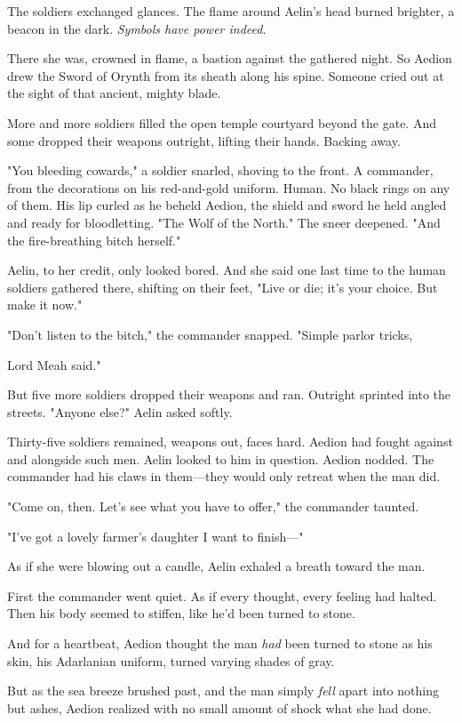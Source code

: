 The soldiers exchanged glances. The flame around Aelin's head burned brighter, a beacon in the dark. \emph{Symbols have power indeed}.

There she was, crowned in flame, a bastion against the gathered night. So Aedion drew the Sword of Orynth from its sheath along his spine. Someone cried out at the sight of that ancient, mighty blade.

More and more soldiers filled the open temple courtyard beyond the gate. And some dropped their weapons outright, lifting their hands. Backing away.

"You bleeding cowards," a soldier snarled, shoving to the front. A commander, from the decorations on his red-and-gold uniform. Human. No black rings on any of them. His lip curled as he beheld Aedion, the shield and sword he held angled and ready for bloodletting. "The Wolf of the North." The sneer deepened. "And the fire-breathing bitch herself."

Aelin, to her credit, only looked bored. And she said one last time to the human soldiers gathered there, shifting on their feet, "Live or die; it's your choice. But make it now."

"Don't listen to the bitch," the commander snapped. "Simple parlor tricks,

Lord Meah said."

But five more soldiers dropped their weapons and ran. Outright sprinted into the streets. "Anyone else?" Aelin asked softly.

Thirty-five soldiers remained, weapons out, faces hard. Aedion had fought against and alongside such men. Aelin looked to him in question. Aedion nodded. The commander had his claws in them---they would only retreat when the man did.

"Come on, then. Let's see what you have to offer," the commander taunted.

"I've got a lovely farmer's daughter I want to finish---"

As if she were blowing out a candle, Aelin exhaled a breath toward the man.

First the commander went quiet. As if every thought, every feeling had halted. Then his body seemed to stiffen, like he'd been turned to stone.

And for a heartbeat, Aedion thought the man \emph{had} been turned to stone as his skin, his Adarlanian uniform, turned varying shades of gray.

But as the sea breeze brushed past, and the man simply \emph{fell} apart into nothing but ashes, Aedion realized with no small amount of shock what she had done.

